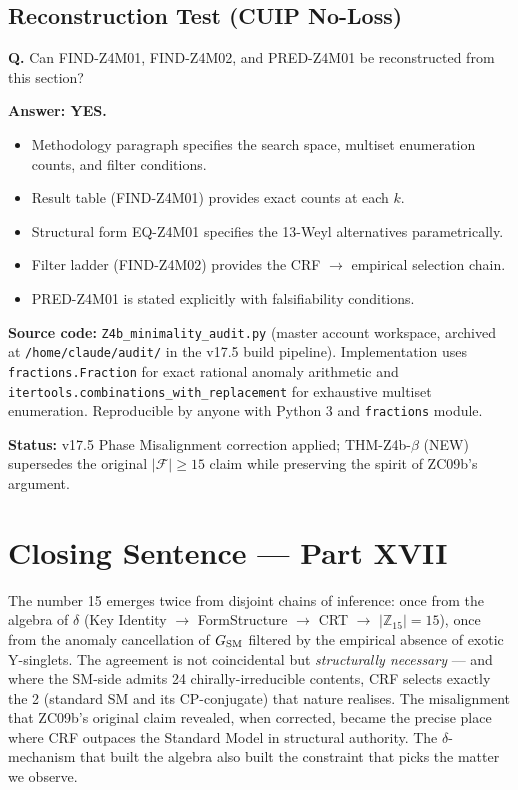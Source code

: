 \documentclass[12pt, a4paper]{article}
\begin{document}
\subsection{Reconstruction Test (CUIP No-Loss)}

\begin{formalbox}[title={Reconstruction Test for Master Audit (NEW v17.5)}]
\textbf{Q.} Can FIND-Z4M01, FIND-Z4M02, and PRED-Z4M01 be reconstructed
from this section?

\textbf{Answer: YES.}
\begin{itemize}[leftmargin=*, noitemsep]
  \item Methodology paragraph specifies the search space, multiset
    enumeration counts, and filter conditions.
  \item Result table (FIND-Z4M01) provides exact counts at each $k$.
  \item Structural form EQ-Z4M01 specifies the 13-Weyl alternatives
    parametrically.
  \item Filter ladder (FIND-Z4M02) provides the CRF $\to$ empirical
    selection chain.
  \item PRED-Z4M01 is stated explicitly with falsifiability conditions.
\end{itemize}

\textbf{Source code:} \texttt{Z4b\_minimality\_audit.py} (master account
workspace, archived at \texttt{/home/claude/audit/} in the v17.5
build pipeline). Implementation uses \texttt{fractions.Fraction} for
exact rational anomaly arithmetic and \texttt{itertools.combinations\_\allowbreak{}with\_replacement}
for exhaustive multiset enumeration. Reproducible by anyone with
Python 3 and \texttt{fractions} module.

\textbf{Status:} v17.5 Phase Misalignment correction applied;
THM-Z4b-$\beta$ (NEW) supersedes the original $|\mathcal{F}| \geq 15$
claim while preserving the spirit of ZC09b's argument.
\end{formalbox}

\section{Closing Sentence — Part XVII}
\label{sec:xvii-closing}

The number 15 emerges twice from disjoint chains of inference: once
from the algebra of $\delta$ (Key Identity $\to$ FormStructure $\to$
CRT $\to$ $|\mathbb{Z}_{15}| = 15$), once from the anomaly cancellation
of $G_{\rm SM}$ filtered by the empirical absence of exotic
Y-singlets. The agreement is not coincidental but \emph{structurally
necessary} — and where the SM-side admits 24 chirally-irreducible
contents, CRF selects exactly the 2 (standard SM and its CP-conjugate)
that nature realises. The misalignment that ZC09b's original claim
revealed, when corrected, became the precise place where CRF outpaces
the Standard Model in structural authority. The $\delta$-mechanism
that built the algebra also built the constraint that picks the
matter we observe.
\end{document}
